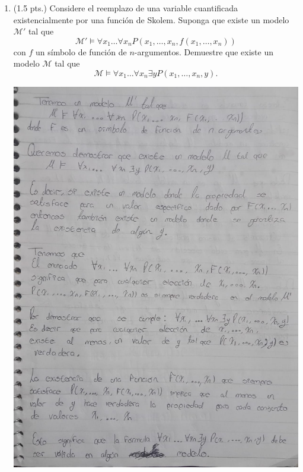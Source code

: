 \documentclass[12pt,letterpaper]{article}
\begin{document}
\begin{enumerate}
\item (1.5 pts.) Considere el reemplazo de una variable cuantificada existencialmente por una función de Skolem. Suponga que existe un modelo \(\mathcal{M}'\) tal que
  \[
  \mathcal{M}' \models \forall x_1 \dots \forall x_n P(x_1, \dots, x_n, f(x_1, \dots, x_n))
  \]
  con \( f \) un símbolo de función de \( n \)-argumentos. Demuestre que existe un modelo \(\mathcal{M}\) tal que
  \[
  \mathcal{M} \models \forall x_1 \dots \forall x_n \exists y P(x_1, \dots, x_n, y).
  \]
  \begin{center}
    \hspace{-1cm} \includegraphics[width=\textwidth,height=0.8\textheight,keepaspectratio]{ejercicio3a.png}
  \end{center}

  \newpage
  

\end{enumerate}
\end{document}
